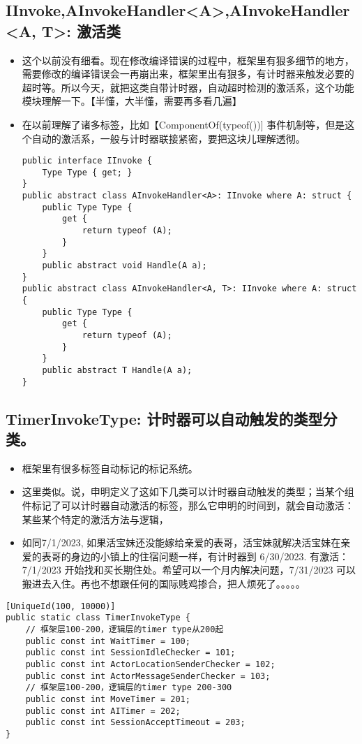 \documentclass[9pt, b5paper]{article}
\begin{document}
\subsection{IInvoke,AInvokeHandler<A>,AInvokeHandler<A, T>: 激活类}
\label{sec-2-17}
\begin{itemize}
\item 这个以前没有细看。现在修改编译错误的过程中，框架里有狠多细节的地方，需要修改的编译错误会一再崩出来，框架里出有狠多，有计时器来触发必要的超时等。所以今天，就把这类自带计时器，自动超时检测的激活系，这个功能模块理解一下。【半懂，大半懂，需要再多看几遍】
\item 在以前理解了诸多标签，比如【ComponentOf(typeof())] 事件机制等，但是这个自动的激活系，一般与计时器联接紧密，要把这块儿理解透彻。
\begin{verbatim}
public interface IInvoke {
    Type Type { get; }
}
public abstract class AInvokeHandler<A>: IInvoke where A: struct {
    public Type Type {
        get {
            return typeof (A);
        }
    }
    public abstract void Handle(A a);
}
public abstract class AInvokeHandler<A, T>: IInvoke where A: struct {
    public Type Type {
        get {
            return typeof (A);
        }
    }
    public abstract T Handle(A a);
}
\end{verbatim}
\end{itemize}
\subsection{TimerInvokeType: 计时器可以自动触发的类型分类。}
\label{sec-2-18}
\begin{itemize}
\item 框架里有很多标签自动标记的标记系统。
\item 这里类似。说，申明定义了这如下几类可以计时器自动触发的类型；当某个组件标记了可以计时器自动激活的标签，那么它申明的时间到，就会自动激活：某些某个特定的激活方法与逻辑，
\item 如同7/1/2023, 如果活宝妹还没能嫁给亲爱的表哥，活宝妹就解决活宝妹在亲爱的表哥的身边的小镇上的住宿问题一样，有计时器到 6/30/2023. 有激活：7/1/2023 开始找和买长期住处。希望可以一个月内解决问题，7/31/2023 可以搬进去入住。再也不想跟任何的国际贱鸡掺合，把人烦死了。。。。。
\end{itemize}
\begin{verbatim}
[UniqueId(100, 10000)]
public static class TimerInvokeType {
    // 框架层100-200，逻辑层的timer type从200起
    public const int WaitTimer = 100;
    public const int SessionIdleChecker = 101;
    public const int ActorLocationSenderChecker = 102;
    public const int ActorMessageSenderChecker = 103;
    // 框架层100-200，逻辑层的timer type 200-300
    public const int MoveTimer = 201;
    public const int AITimer = 202;
    public const int SessionAcceptTimeout = 203;
}
\end{verbatim}
\end{document}
